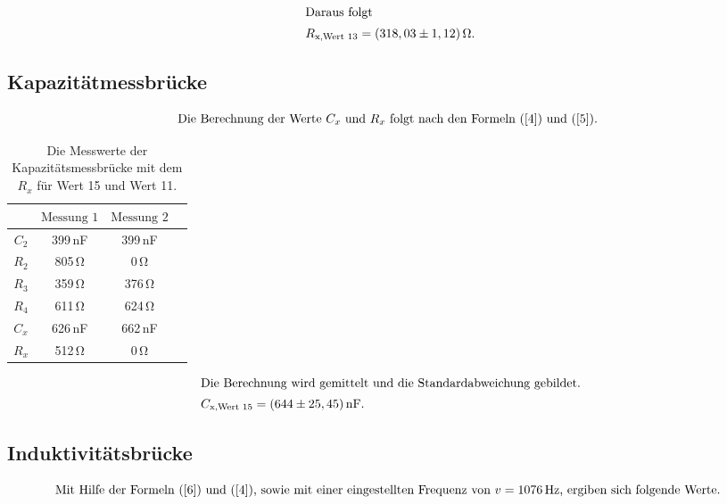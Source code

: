 \begin{align*}
    \intertext{Daraus folgt}
    R_{\text{x,Wert 13}} = (318,03 \pm 1,12)\,\unit{\ohm}.
\end{align*}


\subsection{Kapazitätmessbrücke}

\begin{align*}
    \intertext{Die Berechnung der Werte $C_{x}$ und $R_{x}$ folgt nach den Formeln (\ref{4}) und (\ref{5}). }
\end{align*}

\begin{table}[H]
    \centering
    \caption{Die Messwerte der Kapazitätsmessbrücke mit dem $R_{x}$ für Wert 15 und Wert 11.}
    \label{Tabelle3}
    \begin{tabular} {c  c  c  c}
        \toprule
        {$ $} &
        {$ \text{Messung 1} $} &
        {$ \text{Messung 2} $}\\
        \midrule
        $C_{2}$ & 399\,\unit{\nano\farad} & 399\,\unit{\nano\farad} \\
        $R_{2}$ & 805\,\unit{\ohm} & 0\,\unit{\ohm}   \\
        $R_{3}$ & 359\,\unit{\ohm} & 376\,\unit{\ohm} \\
        $R_{4}$ & 611\,\unit{\ohm} & 624\,\unit{\ohm} \\
        $C_{x}$ & 626\,\unit{\nano\farad} & 662\,\unit{\nano\farad} \\
        $R_{x}$ & 512\,\unit{\ohm} & 0\,\unit{\ohm}   \\
        \bottomrule
    \end{tabular} 
\end{table}

\begin{align*}
    \intertext{Die Berechnung wird gemittelt und die Standardabweichung gebildet.}
    C_{\text{x,Wert 15}} = (644 \pm 25,45)\,\unit{\nano\farad}.
\end{align*}

\subsection{Induktivitätsbrücke}

\begin{align*}
    \intertext{Mit Hilfe der Formeln (\ref{6}) und (\ref{4}), sowie mit einer eingestellten Frequenz von $v = 1076\,\unit{\hertz}$, ergiben sich folgende Werte. }
\end{align*}

